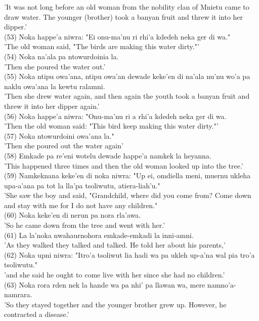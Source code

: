 \documentclass[10pt]{article}
\begin{document}
'It was not long before an old woman from the nobility clan of Mnietu came to draw water. The younger (brother) took a banyan fruit and threw it into her dipper.'\\
(53) Noka happe'a niwra: "Ei onu-ma'nu ri rhi'a kdedeh neka ger di wa."\\
'The old woman said, "The birds are making this water dirty."'\\
(54) Noka na'ala pa ntowurdoinia la.\\
'Then she poured the water out.'\\
(55) Noka ntipu owa'ana, ntipu owa'an dewade keke'en di na'ala nu'nu wo'a pa naklu owa'ana la kewtu ralamni.\\
'Then she drew water again, and then again the youth took a banyan fruit and threw it into her dipper again.'\\
(56) Noka happe'a niwra: "Onu-ma'nu ri a rhi'a kdedeh neka ger di wa.\\
'Then the old woman said: "This bird keep making this water dirty."'\\
(57) Noka ntowurdoini owa'ana la."\\
'Then she poured out the water again'\\
(58) Emkade pa re'eni wotelu dewade happe'a namkek la heyanna.\\
'This happened three times and then the old woman looked up into the tree.'\\
(59) Namkeknana keke'en di noka niwra: "Up ei, omdiella meni, muernu ukleha upa-a'ana pa tot la lla'pa tsoliwutu, atiera-liah'u."\\
'She saw the boy and said, "Grandchild, where did you come from? Come down and stay with me for I do not have any children."\\
(60) Noka keke'en di nerun pa nora rla'awa.\\
'So he came down from the tree and went with her.'\\
(61) La la'noka nwahaurnohora emkade-emkadi la inni-amni.\\
'As they walked they talked and talked. He told her about his parents,'\\
(62) Noka upni niwra: "Itro'a tsoliwut lia hadi wa pa ukleh up-a'na wal pia tro'a tsoliwutu."\\
'and she said he ought to come live with her since she had no children.'\\
(63) Noka rora rden nek la hande wa pa nhi' pa llawan wa, mere namno'a-namrara.\\
'So they stayed together and the younger brother grew up. However, he contracted a disease.'\\
\end{document}
